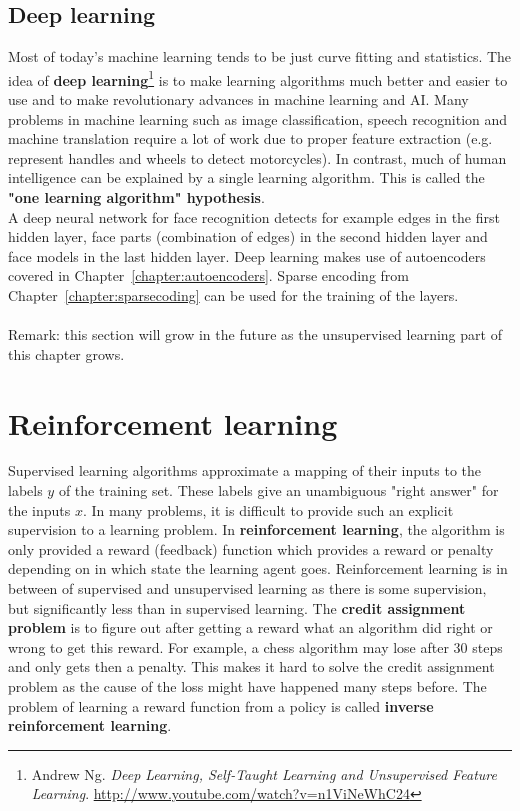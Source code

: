\documentclass{report}
\begin{document}
\section{Deep learning}
Most of today's machine learning tends to be just curve fitting and statistics.
The idea of {\bf deep learning}\footnote{Andrew Ng. {\em Deep Learning, Self-Taught Learning and Unsupervised Feature Learning}. \url{http://www.youtube.com/watch?v=n1ViNeWhC24}} is to make learning algorithms much better and easier to use and to make revolutionary advances in machine learning and AI.
Many problems in machine learning such as image classification, speech recognition and machine translation require a lot of work due to proper feature extraction (e.g. represent handles and wheels to detect motorcycles).
In contrast, much of human intelligence can be explained by a single learning algorithm. This is called the {\bf "one learning algorithm" hypothesis}. \\
A deep neural network for face recognition detects for example edges in the first hidden layer, face parts (combination of edges) in the second hidden layer and face models in the last hidden layer.
Deep learning makes use of autoencoders covered in Chapter~\ref{chapter:autoencoders}.
Sparse encoding from Chapter~\ref{chapter:sparsecoding} can be used for the training of the layers.
\\
\\
Remark: this section will grow in the future as the unsupervised learning part of this chapter grows.


\chapter{Reinforcement learning}
\label{chapter:reinforcementlearning}

Supervised learning algorithms approximate a mapping of their inputs to the labels $y$ of the training set.
These labels give an unambiguous "right answer" for the inputs $x$. In many problems, it is difficult to provide such an explicit supervision to a learning problem.
In {\bf reinforcement learning}, the algorithm is only provided a reward (feedback) function which provides a reward or penalty depending on in which state the learning agent goes.
Reinforcement learning is in between of supervised and unsupervised learning as there is some supervision, but significantly less than in supervised learning.
The {\bf credit assignment problem} is to figure out after getting a reward what an algorithm did right or wrong to get this reward.
For example, a chess algorithm may lose after 30 steps and only gets then a penalty.
This makes it hard to solve the credit assignment problem as the cause of the loss might have happened many steps before.
The problem of learning a reward function from a policy is called {\bf inverse reinforcement learning}.
\end{document}
